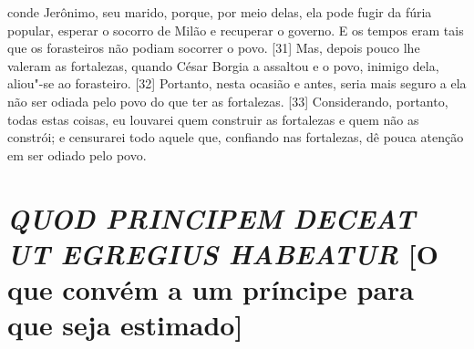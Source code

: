 conde Jerônimo, seu marido, porque, por meio delas, ela pode fugir da
fúria popular, esperar o socorro de Milão e recuperar o governo. E os
tempos eram tais que os forasteiros não podiam socorrer o povo. {[}31{]}
Mas, depois pouco lhe valeram as fortalezas, quando César Borgia a
assaltou e o povo, inimigo dela, aliou"-se ao forasteiro. {[}32{]}
Portanto, nesta ocasião e antes, seria mais seguro a ela não ser odiada
pelo povo do que ter as fortalezas. {[}33{]} Considerando, portanto,
todas estas coisas, eu louvarei quem construir as fortalezas e quem não
as constrói; e censurarei todo aquele que, confiando nas fortalezas, dê
pouca atenção em ser odiado pelo povo.

\quebra\section{\emph{QUOD PRINCIPEM DECEAT UT EGREGIUS HABEATUR}
{[}O que convém a um príncipe para que seja estimado{]}}

